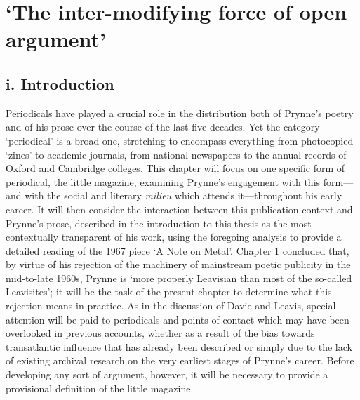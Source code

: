 \documentclass[]{article}
\begin{document}
\newpage

\section{\texorpdfstring{`The inter-modifying force of open
argument'}{The inter-modifying force of open argument}}\label{the-inter-modifying-force-of-open-argument}

\subsection{i. Introduction}\label{i.-introduction-1}

Periodicals have played a crucial role in the distribution both of
Prynne's poetry and of his prose over the course of the last five
decades. Yet the category `periodical' is a broad one, stretching to
encompass everything from photocopied `zines' to academic journals, from
national newspapers to the annual records of Oxford and Cambridge
colleges. This chapter will focus on one specific form of periodical,
the little magazine, examining Prynne's engagement with this form---and
with the social and literary \emph{milieu} which attends it---throughout
his early career. It will then consider the interaction between this
publication context and Prynne's prose, described in the introduction to
this thesis as the most contextually transparent of his work, using the
foregoing analysis to provide a detailed reading of the 1967 piece `A
Note on Metal'. Chapter 1 concluded that, by virtue of his rejection of
the machinery of mainstream poetic publicity in the mid-to-late 1960s,
Prynne is `more properly Leavisian than most of the so-called
Leavisites'; it will be the task of the present chapter to determine
what this rejection means in practice. As in the discussion of Davie and
Leavis, special attention will be paid to periodicals and points of
contact which may have been overlooked in previous accounts, whether as
a result of the bias towards transatlantic influence that has already
been described or simply due to the lack of existing archival research
on the very earliest stages of Prynne's career. Before developing any
sort of argument, however, it will be necessary to provide a provisional
definition of the little magazine.
\end{document}
